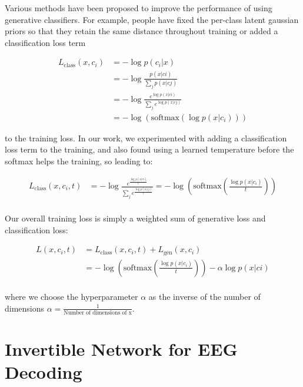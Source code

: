 Various methods have been proposed to improve the performance of using
generative classifiers. For example, people have fixed the per-class
latent gaussian priors so that they retain the same distance throughout
training \citep{DBLP:conf/icml/IzmailovKFW20} or added a
classification loss term

\begin{align*}
L_\textrm{class}(x,c_i)&=-\log p(c_i|x)\\
&= -\log \frac{p(x|ci)}{\sum_j p(x|cj)}\\
&=-\log \frac{e^{\log p(x|ci)}}{\sum_j e^{\log p(x|cj)}}\\
&=-\log \left( \mathrm{softmax}\left({\log p(x|c_i)}\right) \right)
\end{align*}

to the training loss\citep{DBLP:conf/nips/ArdizzoneMRK20}. In
our work, we experimented with adding a classification loss term to the
training, and also found using a learned temperature before the softmax
helps the training, so leading to:

\begin{align}
   L_\textrm{class}(x,c_i,t)&= -\log \frac{e^{\frac{\log p(x|ci)}{t}}}{\sum_j e^{\frac{\log p(x|cj)}{t}}}=-\log \left( \mathrm{softmax}\left({\frac{\log p(x|c_i)}{t}}\right) \right) \\
\end{align}

Our overall training loss is simply a weighted sum of generative loss
and classification loss:

\begin{align}
   L(x,c_i,t)&= L_\textrm{class}(x,c_i,t) + L_\textrm{gen}(x,c_i)\\
   &= -\log \left( \mathrm{softmax}\left({\frac{\log p(x|c_i)}{t}}\right) \right) - \alpha \log p(x|ci)\\
\end{align}

where we choose the hyperparameter $\alpha$ as the inverse of the
number of dimensions $\alpha=\frac{1}{\textrm{Number of dimensions of x}}$.

\section{Invertible Network for EEG
Decoding}\label{invertible-network-for-eeg-decoding}


